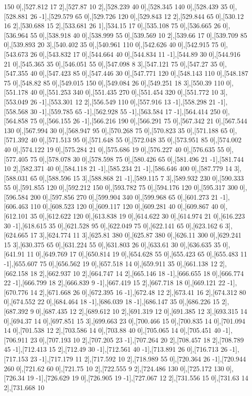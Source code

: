 {150 0],[527.812 17 2],[527.87 10 2],[528.239 40 0],[528.345 140 0],[528.439 35 0],[528.881 26 -1],[529.579 65 0],[529.726 120 0],[529.843 12 2],[529.844 65 0],[530.12 16 2],[530.688 15 2],[533.681 26 1],[534.15 17 0],[535.108 75 0],[536.665 26 0],[536.964 55 0],[538.918 40 0],[538.999 55 0],[539.569 10 2],[539.66 17 0],[539.709 85 0],[539.893 20 3],[540.402 35 0],[540.961 110 0],[542.626 40 0],[542.915 75 0],[543.673 26 0],[543.832 17 0],[544.664 40 0],[544.834 11 -1],[544.89 30 0],[544.916 21 0],[545.365 35 0],[546.051 55 0],[547.098 8 3],[547.121 75 0],[547.27 35 0],[547.355 40 0],[547.423 85 0],[547.446 30 0],[547.771 120 0],[548.143 110 0],[548.187 75 0],[548.82 85 0],[549.015 150 0],[549.084 26 0],[549.251 18 3],[550.39 110 0],[551.178 40 0],[551.253 340 0],[551.435 270 0],[551.454 320 0],[551.772 10 3],[553.049 26 -1],[553.301 12 2],[556.549 110 0],[557.916 13 -1],[558.298 21 -1],[558.568 30 -1],[559.785 65 -1],[562.928 55 -1],[563.584 17 -1],[564.414 250 0],[564.858 75 0],[566.155 26 -1],[566.216 190 0],[566.291 75 0],[567.342 21 0],[567.544 130 0],[567.994 30 0],[568.947 95 0],[570.268 75 0],[570.823 35 0],[571.188 65 0],[571.392 40 0],[571.513 95 0],[571.648 55 0],[572.048 35 0],[573.951 85 0],[574.002 40 0],[574.122 19 0],[575.284 21 0],[575.686 19 0],[576.227 40 0],[576.635 55 0],[577.405 75 0],[578.078 30 0],[578.598 75 0],[580.426 65 0],[581.496 21 -1],[581.744 10 2],[582.371 40 0],[584.118 21 -1],[585.234 21 -1],[586.646 400 0],[587.779 14 3],[588.031 65 0],[588.596 15 3],[588.868 21 -1],[589.115 7 3],[589.932 230 0],[590.333 55 0],[591.855 120 0],[592.212 150 0],[593.782 75 0],[594.176 120 0],[595.317 300 0],[596.584 200 0],[597.856 270 0],[599.904 340 0],[599.968 65 0],[601.273 21 -1],[606.463 110 0],[608.523 120 0],[609.117 120 0],[609.281 40 0],[609.867 40 0],[612.101 35 0],[612.622 120 0],[613.838 19 0],[614.622 30 0],[614.974 21 0],[616.223 30 -1],[618.615 35 0],[621.528 95 0],[622.049 75 0],[622.141 65 0],[623.162 6 3],[624.665 17 3],[624.774 11 3],[625.81 380 0],[625.87 380 0],[626.11 300 0],[629.241 15 3],[630.375 65 0],[631.224 55 0],[631.803 26 0],[633.61 30 0],[636.635 35 0],[641.91 11 0],[649.769 17 0],[650.814 19 0],[654.628 55 0],[655.423 65 0],[655.483 11 -1],[655.607 75 0],[656.562 19 0],[657.518 14 0],[659.911 35 0],[661.138 12 2],[662.158 18 2],[662.937 10 2],[664.747 14 2],[665.146 18 -1],[666.655 18 0],[666.774 22 -1],[666.799 18 2],[666.839 9 -1],[667.419 15 2],[667.718 18 0],[669.121 22 -1],[670.776 14 2],[671.668 26 0],[672.395 16 -1],[672.48 12 2],[673.41 16 2],[674.312 80 0],[674.552 22 0],[684.464 18 -1],[686.039 18 -1],[686.147 35 0],[686.226 15 2],[687.392 9 0],[687.435 12 2],[689.612 10 2],[691.319 12 0],[691.385 12 3],[693.315 14 0],[694.37 14 0],[697.851 15 3],[699.663 23 0],[700.466 15 0],[700.835 14 0],[701.094 14 0],[701.538 12 2],[703.586 14 0],[703.88 40 0],[705.065 14 0],[705.451 40 -1],[706.911 23 0],[707.193 10 2],[707.205 23 -1],[707.264 20 2],[708.457 18 2],[708.789 45 -1],[712.413 15 2],[712.49 30 -1],[712.561 40 -1],[713.891 26 0],[716.713 26 -1],[717.153 23 -1],[717.179 11 2],[717.592 10 2],[718.989 55 0],[720.364 26 -1],[720.944 260 0],[721.62 60 0],[721.75 10 2],[722.555 9 2],[724.486 130 0],[725.172 130 0],[726.34 19 -1],[726.629 19 0],[726.905 19 -1],[727.067 12 2],[731.556 15 0],[731.63 14 2],[731.668 10 }
